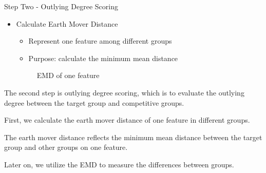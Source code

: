 \documentclass[
 size=14pt,
 paper=smartboard,  %
 mode=present, 		%
 display=slides, 	%
 style=tuliplab,  	%
 pauseslide,
 fleqn,leqno]{powerdot}
\begin{document}
\begin{slide}{Step Two - Outlying Degree Scoring}
\begin{itemize}
\item
Calculate Earth Mover Distance

\begin{itemize}
\item
Represent one feature among different groups

\item
Purpose: calculate the minimum mean distance
\end{itemize}

\begin{figure}
   \caption{EMD of one feature}\label{EMD}
\end{figure}
\end{itemize}

\begin{note}
The second step is outlying degree scoring,
which is to evaluate the outlying degree between the target group and competitive groups.

First,
we calculate the earth mover distance of one feature in different groups.

The earth mover distance reflects the minimum mean distance between
the target group and other groups on one feature.

Later on,
we utilize the EMD to measure the differences between groups.
\end{note}

\end{slide}
\end{document}

